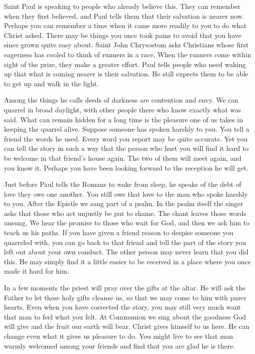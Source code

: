 Saint Paul is speaking to people who already believe this. They can remember when they first believed, and Paul tells them that their salvation is nearer now. Perhaps you can remember a time when it came more readily to you to do what Christ asked. There may be things you once took pains to avoid that you have since grown quite easy about. Saint John Chrysostom asks Christians whose first eagerness has cooled to think of runners in a race. When the runners come within sight of the prize, they make a greater effort. Paul tells people who need waking up that what is coming nearer is their salvation. He still expects them to be able to get up and walk in the light.

Among the things he calls deeds of darkness are contention and envy. We can quarrel in broad daylight, with other people there who know exactly what was said. What can remain hidden for a long time is the pleasure one of us takes in keeping the quarrel alive. Suppose someone has spoken harshly to you. You tell a friend the words he used. Every word you report may be quite accurate. Yet you can tell the story in such a way that the person who hurt you will find it hard to be welcome in that friend's house again. The two of them will meet again, and you know it. Perhaps you have been looking forward to the reception he will get.

Just before Paul tells the Romans to wake from sleep, he speaks of the debt of love they owe one another. You still owe that love to the man who spoke harshly to you. After the Epistle we sang part of a psalm. In the psalm itself the singer asks that those who act unjustly be put to shame. The chant leaves those words unsung. We hear the promise to those who wait for God, and then we ask him to teach us his paths. If you have given a friend reason to despise someone you quarreled with, you can go back to that friend and tell the part of the story you left out about your own conduct. The other person may never learn that you did this. He may simply find it a little easier to be received in a place where you once made it hard for him.

In a few moments the priest will pray over the gifts at the altar. He will ask the Father to let these holy gifts cleanse us, so that we may come to him with purer hearts. Even when you have corrected the story, you may still very much want that man to feel what you felt. At Communion we sing about the goodness God will give and the fruit our earth will bear. Christ gives himself to us here. He can change even what it gives us pleasure to do. You might live to see that man warmly welcomed among your friends and find that you are glad he is there.

